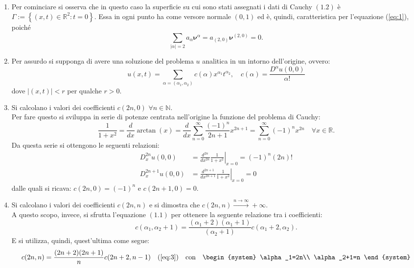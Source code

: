 \begin{example}
\begin{enumerate}
\item
Per cominciare si osserva che in questo caso la superficie su cui sono stati assegnati i dati di Cauchy $(1.2)$ è 
$\Gamma:=\left\lbrace(x,t) \in \mathbb{R}^2:t=0\right\rbrace$. Essa in ogni punto ha come versore normale $(0,1)$ ed è, quindi,
caratteristica per l'equazione (\ref{eq:1}), poiché
$$\sum_{|\alpha|=2}^{\;} a_\alpha \boldsymbol{\nu}^\alpha = a_{(2,0)}\boldsymbol{\nu}^{(2,0)} = 0.$$
\item
Per assurdo si supponga di avere una soluzione del problema $u$ analitica in un intorno dell'origine, ovvero:
$$u(x,t) = \sum_{\alpha = (\alpha_1, \alpha_2) }^{\;} c(\alpha) x^{\alpha_1} t ^{\alpha_2}, \quad
 c(\alpha) = \frac{D^\alpha u(0,0)}{\alpha!}$$
dove $|(x,t)|<r$ per qualche $r>0$.
\item
Si calcolano i valori dei coefficienti $c(2n,0)$ $\forall n \in \mathbb{N}$.\\
Per fare questo si sviluppa in serie di potenze centrata nell'origine la funzione del problema di Cauchy:
$$\frac{1}{1+x^2} = \frac{d}{dx}\arctan(x) = \frac{d}{dx}\sum_{n=0}^{\infty}\frac{(-1)^n}{2n+1}x^{2n+1} 
= \sum_{n=0}^{\infty}(-1)^n x^{2n} \quad \forall x \in \mathbb{R}.$$
Da questa serie si ottengono le seguenti relazioni:
\begin{align*}
D_x^{2n}u(0,0) &= \frac{d^{2n}}{dx^{2n}} \left. \frac{1}{1+x^2}\right|_{x=0} = (-1)^n (2n)!\\
D_x^{2n+1}u(0,0) &= \frac{d^{2n+1}}{dx^{2n+1}} \left. \frac{1}{1+x^2} \right|_{x=0} = 0
\end{align*} 
dalle quali si ricava: $c(2n,0)=(-1)^n$ e $c(2n+1,0)=0$.
\item
Si calcolano i valori dei coefficienti $c(2n,n)$ e si dimostra che  $c(2n,n) \xrightarrow{n\rightarrow\infty} +\infty$.\\
A questo scopo, invece, si sfrutta l'equazione $(1.1)$ per ottenere la seguente relazione tra i coefficienti:
\begin{equation} 
\label{eq:3}
c(\alpha_1,\alpha_2+1) = \frac{(\alpha_1+2)(\alpha_1+1)}{(\alpha_2+1)}c(\alpha_1+2,\alpha_2).
\end{equation}
E si utilizza, quindi, quest'ultima come segue:
\begin{align*}
c(2n,n) &= \frac{(2n+2)(2n+1)}{n}c(2n+2,n-1)   &(\ref{eq:3})\quad\text{con} \quad 
\begin{system}
\alpha_1=2n\\
\alpha_2+1=n
\end{system}\\

\end{align*}
\end{enumerate}
\end{example}
